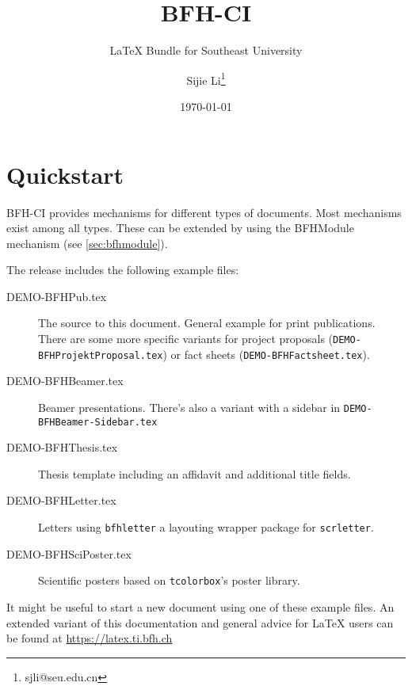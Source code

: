 \documentclass[
]{bfhpub}				%
\newcommand*{\pkg}[1]{\texttt{#1}}
\newcommand*{\file}[1]{\texttt{#1}}
\begin{document}
  \title{BFH-CI}
  \subtitle{\LaTeX{} Bundle for Southeast University}
  \author{Sijie Li\thanks{sjli@seu.edu.cn}
  }
  \publishers{Department of Logistics Management and Engineering}
  \date{\today}
  
  \maketitle
  \tableofcontents

\newpage

\section{Quickstart}
BFH-CI provides mechanisms for different types of documents.
Most mechanisms exist among all types. These can be extended by using the BFHModule mechanism (see \autoref{sec:bfhmodule}).

The release includes the following example files:

\begin{description}
	\item[DEMO-BFHPub.tex] The source to this document. General example for print publications. There are some more specific variants for project proposals (\file{DEMO-BFHProjektProposal.tex}) or fact sheets (\file{DEMO-BFHFactsheet.tex}).
	\item[DEMO-BFHBeamer.tex] Beamer presentations. There's also a variant with a sidebar in \file{DEMO-BFHBeamer-Sidebar.tex}
	\item[DEMO-BFHThesis.tex] Thesis template including an affidavit and additional title fields.
	\item[DEMO-BFHLetter.tex] Letters using \pkg{bfhletter} a layouting wrapper package for \pkg{scrletter}.
	\item[DEMO-BFHSciPoster.tex] Scientific posters based on \pkg{tcolorbox}'s poster library.
\end{description}

\noindent It might be useful to start a new document using one of these example files.
An extended variant of this documentation and general advice for LaTeX users can be found at \url{https://latex.ti.bfh.ch}
\end{document}
